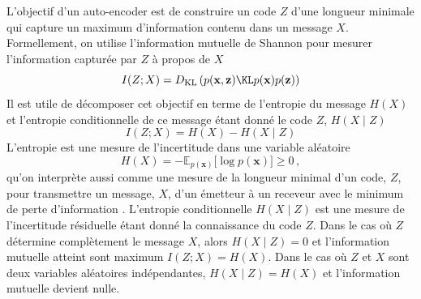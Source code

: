 L'objectif d'un auto-encoder est de construire un code $Z$ d'une longueur minimale qui capture un maximum d'information contenu dans un message $X$. 
Formellement, on utilise l'information mutuelle de Shannon pour mesurer l'information capturée par $Z$ à propos de $X$
\begin{equation}\label{eq:ShannonInfo}
        I(Z ; X) = D_{\mathrm{KL}}\left(p(\mathbf{x}, \mathbf{z}) \KL p(\mathbf{x}) p(\mathbf{z})\right) %
\end{equation} 
Il est utile de décomposer cet objectif en terme de l'entropie du message $H(X)$ et l'entropie 
conditionnelle de ce message étant donné le code $Z$, $H(X \mid Z)$
\begin{equation}\label{eq:info entropy}
       I(Z; X) = H(X) - H(X \mid Z) 
\end{equation} 
L'entropie est une mesure de l'incertitude dans une variable aléatoire
\begin{equation}\label{eq:entropy}
        H(X) = -\mathbb{E}_{p(\mathbf{x})}\big[\log p(\mathbf{x}) \big] \geq 0\, ,
\end{equation} 
qu'on interprète aussi comme une mesure de la longueur minimal d'un code, $Z$, pour 
transmettre un message, $X$, d'un émetteur à un receveur avec le minimum de perte d'information \citep{Shannon1948,Kolmogorov1965}.
L'entropie conditionnelle $H(X \mid Z)$ est une  mesure de l'incertitude résiduelle étant donné la connaissance du code $Z$. Dans le cas où $Z$ 
détermine complètement le message $X$, alors $H(X \mid Z) = 0$ et l'information mutuelle atteint sont maximum $I(Z; X) = H(X)$.
Dans le cas où $Z$ et $X$ sont deux variables aléatoires indépendantes, $H(X \mid Z) = H(X)$ et l'information mutuelle devient nulle.

